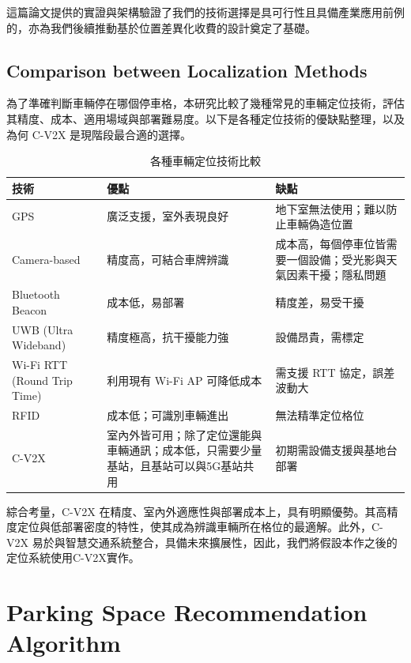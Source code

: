 \documentclass[sigconf,authorversion,nonacm,screen]{acmart}
\begin{document}
這篇論文提供的實證與架構驗證了我們的技術選擇是具可行性且具備產業應用前例的，亦為我們後續推動基於位置差異化收費的設計奠定了基礎。

\subsection{Comparison between Localization Methods}

\quad 為了準確判斷車輛停在哪個停車格，本研究比較了幾種常見的車輛定位技術，評估其精度、成本、適用場域與部署難易度。以下是各種定位技術的優缺點整理，以及為何 C-V2X 是現階段最合適的選擇。

\begin{table}[h]
\centering
\begin{tabular}{|p{2.5cm}|p{3cm}|p{2.5cm}|}
\hline
\textbf{技術} & \textbf{優點} & \textbf{缺點} \\
\hline
GPS & 廣泛支援，室外表現良好 & 地下室無法使用；難以防止車輛偽造位置  \\
\hline
Camera-based & 精度高，可結合車牌辨識 & 成本高，每個停車位皆需要一個設備；受光影與天氣因素干擾；隱私問題  \\
\hline
Bluetooth Beacon & 成本低，易部署 & 精度差，易受干擾   \\
\hline
UWB (Ultra Wideband) & 精度極高，抗干擾能力強 & 設備昂貴，需標定 \\
\hline
Wi-Fi RTT (Round Trip Time) & 利用現有 Wi-Fi AP 可降低成本 & 需支援 RTT 協定，誤差波動大 \\
\hline
RFID & 成本低；可識別車輛進出 & 無法精準定位格位 \\
\hline
C-V2X & 室內外皆可用；除了定位還能與車輛通訊；成本低，只需要少量基站，且基站可以與5G基站共用 & 初期需設備支援與基地台部署  \\
\hline
\end{tabular}
\caption{各種車輛定位技術比較}
\end{table}

綜合考量，C-V2X 在精度、室內外適應性與部署成本上，具有明顯優勢。其高精度定位與低部署密度的特性，使其成為辨識車輛所在格位的最適解。此外，C-V2X 易於與智慧交通系統整合，具備未來擴展性，因此，我們將假設本作之後的定位系統使用C-V2X實作。


\section{Parking Space Recommendation Algorithm}
\end{document}
